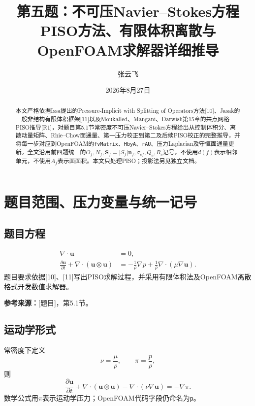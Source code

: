 \documentclass[UTF8,12pt,a4paper]{ctexart}
\title{\bfseries 第五题：不可压Navier--Stokes方程\\PISO方法、有限体积离散与OpenFOAM求解器详细推导}
\author{张云飞}
\date{2026年8月27日}
\numberwithin{equation}{section}
\newcommand{\Task}{\textnormal{[题目]}}
\newcommand{\Issa}{\textnormal{[10]}}
\newcommand{\Jasak}{\textnormal{[11]}}
\newcommand{\Rone}{\textnormal{[R1]}}
\newcommand{\source}[1]{\par\smallskip\noindent\colorbox{sourcebg}{%
  \parbox{0.955\linewidth}{\footnotesize\color{sourcegray}\textbf{参考来源：}#1}}\par\smallskip}
\begin{document}
\maketitle
\begin{abstract}
本文严格依据Issa提出的Pressure-Implicit with Splitting of Operators方法\Issa、Jasak的一般非结构有限体积框架\Jasak 以及Moukalled、Mangani、Darwish第15章的共点网格PISO推导\Rone，对题目第5.1节常密度不可压Navier--Stokes方程给出从控制体积分、离散动量矩阵、Rhie--Chow面通量、第一压力校正到第二及后续PISO校正的完整推导，并将每一步对应到OpenFOAM的\texttt{fvMatrix}、\texttt{HbyA}、\texttt{rAU}、压力Laplacian及守恒面通量更新。全文沿用前四题统一的$O_f,N_f,\bm S_f=|S_f|\bm n_f,\sigma_{cf},Q_c,R_c$记号，不使用$d(f)$表示相邻单元，不使用$A_f$表示面面积。本文只处理PISO；投影法另见独立文档。
\end{abstract}
\tableofcontents
\newpage

\section*{题目范围、压力变量与统一记号}
\subsection*{题目方程}
\begin{align}
  \nabla\cdot\bm u&=0,\label{eq:continuity}\\
  \frac{\partial\bm u}{\partial t}+\nabla\cdot(\bm u\otimes\bm u)
  &=-\frac1\rho\nabla p+\frac1\rho\nabla\cdot(\mu\nabla\bm u).
  \label{eq:momentum}
\end{align}
题目要求依据\Issa、\Jasak 写出PISO求解过程，并采用有限体积法及OpenFOAM离散格式开发数值求解器。
\source{\Task，第5.1节。}

\subsection*{运动学形式}
常密度下定义
\begin{equation}
  \boxed{\nu=\frac{\mu}{\rho},\qquad \pi=\frac{p}{\rho},}
  \label{eq:kinematic}
\end{equation}
则
\begin{equation}
  \frac{\partial\bm u}{\partial t}
  +\nabla\cdot(\bm u\otimes\bm u)
  -\nabla\cdot(\nu\nabla\bm u)=-\nabla\pi.
  \label{eq:momentum_pi}
\end{equation}
数学公式用$\pi$表示运动学压力；OpenFOAM代码字段仍命名为\texttt{p}。
\end{document}
